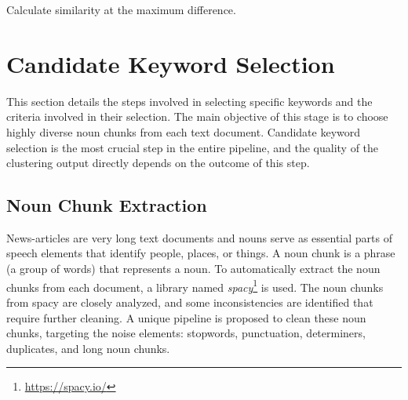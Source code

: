  
 \begin{algorithm}[H]
 	\DontPrintSemicolon
 	
 	
 	
 	
 	\caption{Calculate similarity at the maximum difference.} \label{algo:max_diff}
 \end{algorithm}

\section{Candidate Keyword Selection}

This section details the steps involved in selecting specific keywords and the criteria involved
in their selection. The main objective of this stage is to choose highly diverse noun chunks from each
text document. Candidate keyword selection is the most crucial step in the entire pipeline, and the
quality of the clustering output directly depends on the outcome of this step.

\subsection{Noun Chunk Extraction}

News-articles are very long text documents and nouns serve as essential parts of speech elements that identify people, places, or things. A noun chunk is a phrase (a group of words) that represents a noun. To automatically extract the noun chunks from each document, a library named \emph{spacy}\footnote{\url{https://spacy.io/}} is used. The noun chunks from spacy are closely analyzed, and some inconsistencies are identified that require further cleaning. A unique pipeline is proposed to clean these noun chunks, targeting the noise elements: stopwords, punctuation, determiners, duplicates, and long noun chunks.

